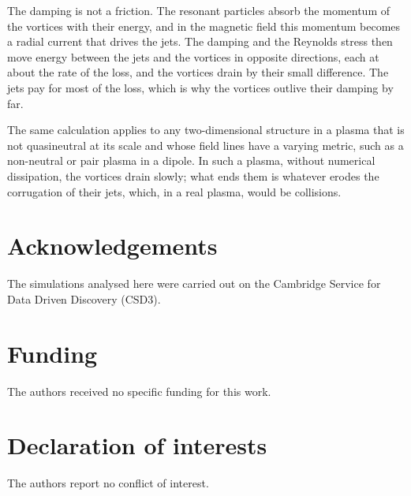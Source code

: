 \documentclass{jpp}
\begin{document}
The damping is not a friction. The resonant particles absorb the momentum of the vortices with their energy, and in the magnetic field this momentum becomes a radial current that drives the jets. The damping and the Reynolds stress then move energy between the jets and the vortices in opposite directions, each at about the rate of the loss, and the vortices drain by their small difference. The jets pay for most of the loss, which is why the vortices outlive their damping by far.

The same calculation applies to any two-dimensional structure in a plasma that is not quasineutral at its scale and whose field lines have a varying metric, such as a non-neutral or pair plasma in a dipole. In such a plasma, without numerical dissipation, the vortices drain slowly; what ends them is whatever erodes the corrugation of their jets, which, in a real plasma, would be collisions.

\section*{Acknowledgements}
The simulations analysed here were carried out on the Cambridge Service for Data Driven Discovery (CSD3).

\section*{Funding}
The authors received no specific funding for this work.

\section*{Declaration of interests}
The authors report no conflict of interest.



\end{document}
